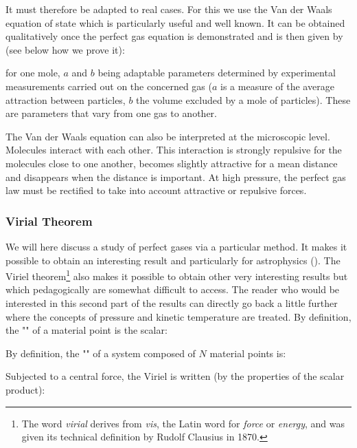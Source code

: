 	It must therefore be adapted to real cases. For this we use the Van der Waals equation of state which is particularly useful and well known. It can be obtained qualitatively once the perfect gas equation is demonstrated and is then given by (see below how we prove it):
	
	for one mole, $a$ and $b$ being adaptable parameters determined by experimental measurements carried out on the concerned gas ($a$ is a measure of the average attraction between particles, $b$ the volume excluded by a mole of particles). These are parameters that vary from one gas to another.

	The Van der Waals equation can also be interpreted at the microscopic level. Molecules interact with each other. This interaction is strongly repulsive for the molecules close to one another, becomes slightly attractive for a mean distance and disappears when the distance is important. At high pressure, the perfect gas law must be rectified to take into account attractive or repulsive forces.
	
	\subsubsection{Virial Theorem}
	We will here discuss a study of perfect gases via a particular method. It makes it possible to obtain an interesting result and particularly for astrophysics (). The Viriel theorem\footnote{The word \textit{virial} derives from \textit{vis}, the Latin word for \textit{force} or \textit{energy}, and was given its technical definition by Rudolf Clausius in 1870.} also makes it possible to obtain other very interesting results but which pedagogically are somewhat difficult to access. The reader who would be interested in this second part of the results can directly go back a little further where the concepts of pressure and kinetic temperature are treated.
	By definition, the "" of a material point is the scalar:
	
	By definition, the "" of a system composed of $N$ material points is:
	
	Subjected to a central force, the Viriel is written (by the properties of the scalar product):
	
